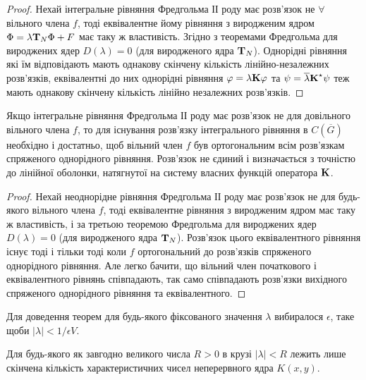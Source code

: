 \begin{proof}
	Нехай інтегральне рівняння Фредгольма ІІ роду має розв'язок не $\forall$ вільного члена $f$, тоді еквівалентне йому рівняння з виродженим ядром $\Phi = \lambda \bf{T}_N \Phi + F$  має таку ж властивість. Згідно з теоремами Фредгольма для вироджених ядер $D(\lambda) = 0$ (для виродженого ядра $\bf{T}_N$). Однорідні рівняння які їм відповідають мають однакову скінчену кількість лінійно-незалежних розв'язків, еквівалентні до них однорідні рівняння  $\phi = \lambda \bf{K} \phi$ та $\psi = \overline \lambda \bf{K}^\star \psi$ теж мають однакову скінчену кількість лінійно незалежних розв'язків.
\end{proof}

\begin{theorem}
	Якщо інтегральне рівняння Фредгольма ІІ роду має розв'язок не для довільного вільного члена $f$, то для існування розв'язку інтегрального рівняння в $C\left(\overline G\right)$ необхідно і достатньо, щоб вільний член $f$ був ортогональним всім розв'язкам спряженого однорідного рівняння. Розв'язок не єдиний і визначається з точністю до лінійної оболонки, натягнутої на систему власних функцій оператора $\bf{K}$.
\end{theorem}

\begin{proof}
	Нехай неоднорідне рівняння Фредгольма ІІ роду має розв'язок не для будь-якого вільного члена $f$, тоді еквівалентне рівняння з виродженим ядром має таку ж властивість, і за третьою теоремою Фредгольма для вироджених ядер $D(\lambda) = 0$ (для виродженого ядра $\bf{T}_N$). Розв'язок цього еквівалентного рівняння існує тоді і тільки тоді коли $f$ ортогональний до розв'язків спряженого однорідного рівняння. Але легко бачити, що вільний член початкового і еквівалентного рівнянь співпадають, так само співпадають розв'язки вихідного спряженого однорідного рівняння та еквівалентного.
\end{proof}

\begin{remark}
	Для доведення теорем для будь-якого фіксованого значення $\lambda$ вибиралося $\epsilon$, таке щоби $|\lambda| < 1 / \epsilon V$.
\end{remark}

\begin{theorem}
	Для будь-якого як завгодно великого числа $R > 0$ в крузі $|\lambda| < R$ лежить лише скінчена кількість характеристичних чисел неперервного ядра $K(x, y)$.
\end{theorem}

